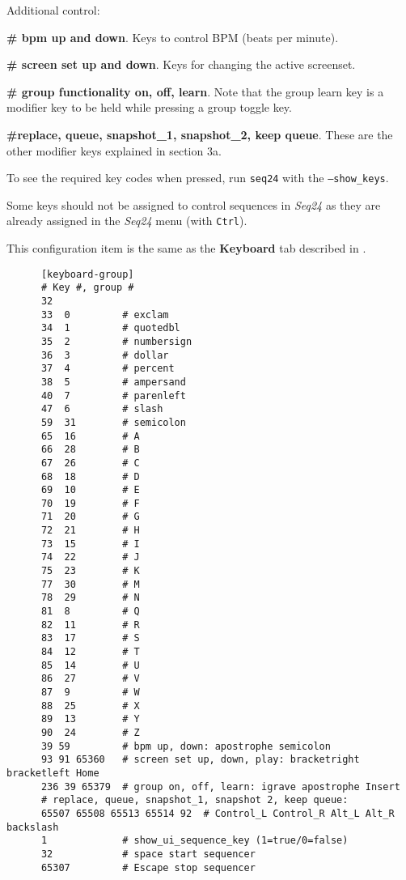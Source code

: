    Additional control:

   \begin{enumber}
   	\item \textbf{\# bpm up and down}.
	      Keys to control BPM (beats per minute).
      \item \textbf{\# screen set up and down}.
	      Keys for changing the active screenset.
      \item \textbf{\# group functionality on, off, learn}.
	      Note that the group learn key is a modifier key to be held while 
         pressing a group toggle key.
      \item \textbf{\#replace, queue, snapshot\_1, snapshot\_2, keep queue}.
         These are the other modifier keys explained in section 3a.
   \end{enumber}

	To see the required key codes when pressed, run \texttt{seq24} with
   the \texttt{--show\_keys}.

   Some keys should not be assigned to control sequences in \textsl{Seq24} as
   they are already assigned in the \textsl{Seq24} menu (with \texttt{Ctrl}). 

   This configuration item is the same as the 
   \textbf{Keyboard} tab described in
   .

   \begin{verbatim}
      [keyboard-group]
      # Key #, group # 
      32
      33  0         # exclam
      34  1         # quotedbl
      35  2         # numbersign
      36  3         # dollar
      37  4         # percent
      38  5         # ampersand
      40  7         # parenleft
      47  6         # slash
      59  31        # semicolon
      65  16        # A
      66  28        # B
      67  26        # C
      68  18        # D
      69  10        # E
      70  19        # F
      71  20        # G
      72  21        # H
      73  15        # I
      74  22        # J
      75  23        # K
      77  30        # M
      78  29        # N
      81  8         # Q
      82  11        # R
      83  17        # S
      84  12        # T
      85  14        # U
      86  27        # V
      87  9         # W
      88  25        # X
      89  13        # Y
      90  24        # Z
      39 59         # bpm up, down: apostrophe semicolon
      93 91 65360   # screen set up, down, play: bracketright bracketleft Home
      236 39 65379  # group on, off, learn: igrave apostrophe Insert
      # replace, queue, snapshot_1, snapshot 2, keep queue:
      65507 65508 65513 65514 92  # Control_L Control_R Alt_L Alt_R backslash
      1             # show_ui_sequence_key (1=true/0=false)
      32            # space start sequencer
      65307         # Escape stop sequencer
   \end{verbatim}

